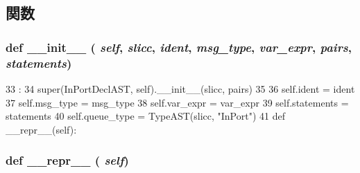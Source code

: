 \subsection{関数}
\hypertarget{classslicc_1_1ast_1_1InPortDeclAST_1_1InPortDeclAST_ac775ee34451fdfa742b318538164070e}{
\subsubsection[{\_\-\_\-init\_\-\_\-}]{\setlength{\rightskip}{0pt plus 5cm}def \_\-\_\-init\_\-\_\- ( {\em self}, \/   {\em slicc}, \/   {\em ident}, \/   {\em msg\_\-type}, \/   {\em var\_\-expr}, \/   {\em pairs}, \/   {\em statements})}}
\label{classslicc_1_1ast_1_1InPortDeclAST_1_1InPortDeclAST_ac775ee34451fdfa742b318538164070e}



\begin{DoxyCode}
33                                                                            :
34         super(InPortDeclAST, self).__init__(slicc, pairs)
35 
36         self.ident = ident
37         self.msg_type = msg_type
38         self.var_expr = var_expr
39         self.statements = statements
40         self.queue_type = TypeAST(slicc, "InPort")
41 
    def __repr__(self):
\end{DoxyCode}
\hypertarget{classslicc_1_1ast_1_1InPortDeclAST_1_1InPortDeclAST_ad8b9328939df072e4740cd9a63189744}{
\subsubsection[{\_\-\_\-repr\_\-\_\-}]{\setlength{\rightskip}{0pt plus 5cm}def \_\-\_\-repr\_\-\_\- ( {\em self})}}
\label{classslicc_1_1ast_1_1InPortDeclAST_1_1InPortDeclAST_ad8b9328939df072e4740cd9a63189744}



